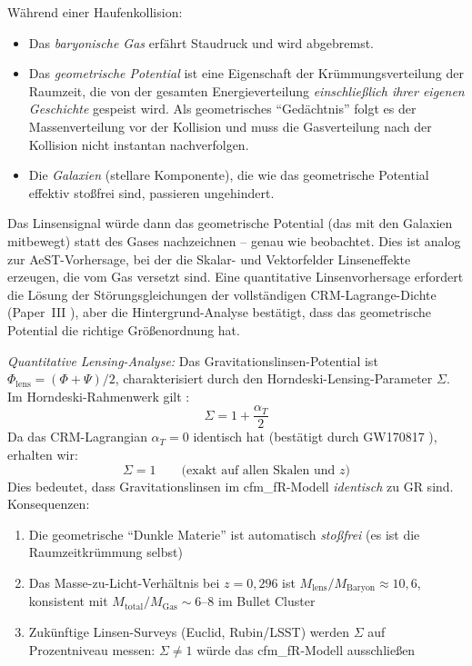 \documentclass[aps,prd,twocolumn,superscriptaddress,nofootinbib,floatfix]{revtex4-2}
\begin{document}
Während einer Haufenkollision:
\begin{itemize}
\item Das \textit{baryonische Gas} erfährt Staudruck und wird abgebremst.
\item Das \textit{geometrische Potential} ist eine Eigenschaft der Krümmungsverteilung der Raumzeit, die von der gesamten Energieverteilung \textit{einschließlich ihrer eigenen Geschichte} gespeist wird. Als geometrisches "`Gedächtnis"' folgt es der Massenverteilung vor der Kollision und muss die Gasverteilung nach der Kollision nicht instantan nachverfolgen.
\item Die \textit{Galaxien} (stellare Komponente), die wie das geometrische Potential effektiv stoßfrei sind, passieren ungehindert.
\end{itemize}

Das Linsensignal würde dann das geometrische Potential (das mit den Galaxien mitbewegt) statt des Gases nachzeichnen -- genau wie beobachtet. Dies ist analog zur AeST-Vorhersage, bei der die Skalar- und Vektorfelder Linseneffekte erzeugen, die vom Gas versetzt sind. Eine quantitative Linsenvorhersage erfordert die Lösung der Störungsgleichungen der vollständigen CRM-Lagrange-Dichte (Paper~III \cite{Geiger2026c}), aber die Hintergrund-Analyse bestätigt, dass das geometrische Potential die richtige Größenordnung hat.

\textit{Quantitative Lensing-Analyse:} Das Gravitationslinsen-Potential ist $\Phi_{\mathrm{lens}} = (\Phi + \Psi)/2$, charakterisiert durch den Horndeski-Lensing-Parameter $\Sigma$. Im Horndeski-Rahmenwerk gilt \cite{Amendola2018}:
\begin{equation}
\Sigma = 1 + \frac{\alpha_T}{2}
\end{equation}
Da das CRM-Lagrangian $\alpha_T = 0$ identisch hat (bestätigt durch GW170817 \cite{Abbott2017gw}), erhalten wir:
\begin{equation}
\Sigma = 1 \qquad \text{(exakt auf allen Skalen und $z$)}
\end{equation}
Dies bedeutet, dass Gravitationslinsen im cfm\_fR-Modell \textit{identisch} zu GR sind. Konsequenzen:
\begin{enumerate}
\item Die geometrische "`Dunkle Materie"' ist automatisch \textit{stoßfrei} (es ist die Raumzeitkrümmung selbst)
\item Das Masse-zu-Licht-Verhältnis bei $z = 0{,}296$ ist $M_{\mathrm{lens}}/M_{\mathrm{Baryon}} \approx 10{,}6$, konsistent mit $M_{\mathrm{total}}/M_{\mathrm{Gas}} \sim 6$--$8$ im Bullet Cluster \cite{Clowe2006}
\item Zukünftige Linsen-Surveys (Euclid, Rubin/LSST) werden $\Sigma$ auf Prozentniveau messen: $\Sigma \neq 1$ würde das cfm\_fR-Modell ausschließen
\end{enumerate}
\end{document}
